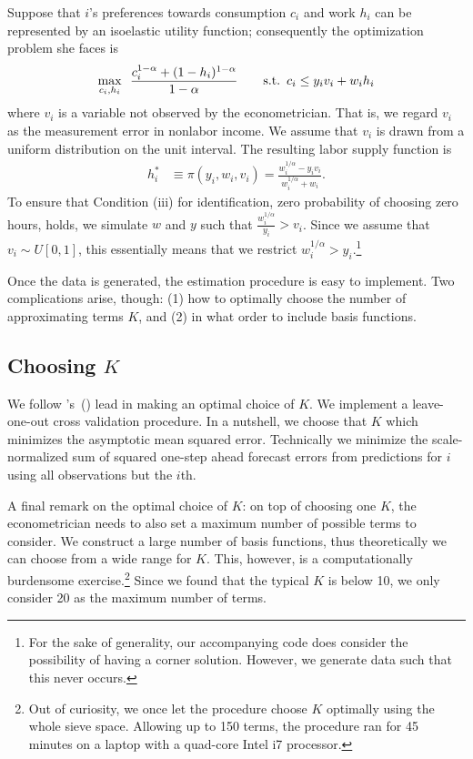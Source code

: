 \documentclass[11pt,letterpaper]{article}                  %
\newcommand\citepos[1]{\citeauthor{#1}'s\ (\citeyear{#1})}
\begin{document}
Suppose that $i$'s preferences towards consumption $c_i$ and work $h_i$ can be represented by an isoelastic utility function; consequently the optimization problem she faces is 
\begin{align*}
	\max_{c_i, h_i} \enskip \frac{c_i^{1-\alpha} + (1-h_i)^{1-\alpha}}{1-\alpha} \qquad \text{s.t.} \enskip c_i \leq y_i v_i + w_i h_i
\end{align*}
where $v_i$ is a variable not observed by the econometrician.
That is, we regard $v_i$ as the measurement error in nonlabor income.
We assume that $v_i$ is drawn from a uniform distribution on the unit interval.
The resulting labor supply function is
\begin{align*}
	h_i^* &\equiv \pi (y_i, w_i, v_i) = \frac{w_i^{1/\alpha} - y_i v_i}{w_i^{1/\alpha} + w_i}.
\end{align*}
To ensure that Condition (iii) for identification, zero probability of choosing zero hours, holds, we simulate $w$ and $y$ such that $\frac{w_i^{1/\alpha}}{y_i} > v_i$.
Since we assume that $v_i \sim U[0, 1]$, this essentially means that we restrict $w_i^{1/\alpha} > y_i$.\footnote{For the sake of generality, our accompanying code does consider the possibility of having a corner solution. However, we generate data such that this never occurs.}

Once the data is generated, the estimation procedure is easy to implement.
Two complications arise, though: (1) how to optimally choose the number of approximating terms $K$, and (2) in what order to include basis functions.

\subsection{Choosing $K$}

We follow \citepos{Blomquist2002} lead in making an optimal choice of $K$.
We implement a leave-one-out cross validation procedure.
In a nutshell, we choose that $K$ which minimizes the asymptotic mean squared error.
Technically we minimize the scale-normalized sum of squared one-step ahead forecast errors from predictions for $i$ using all observations but the $i$th.

A final remark on the optimal choice of $K$: on top of choosing one $K$, the econometrician needs to also set a maximum number of possible terms to consider.
We construct a large number of basis functions, thus theoretically we can choose from a wide range for $K$.
This, however, is a computationally burdensome exercise.\footnote{Out of curiosity, we once let the procedure choose $K$ optimally using the whole sieve space. Allowing up to 150 terms, the procedure ran for 45 minutes on a laptop with a quad-core Intel i7 processor.}
Since we found that the typical $K$ is below 10, we only consider 20 as the maximum number of terms.
\end{document}
